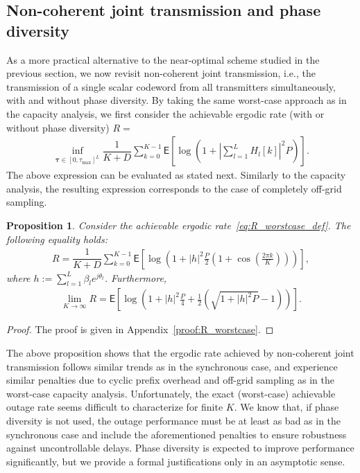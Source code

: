 \documentclass[10pt,journal,a4paper]{IEEEtran}
\newcommand{\eqdef}{:=}
\newcommand{\E}{\mathsf{E}}		%
\renewcommand{\vec}[1]{\bm{#1}}		%
\newtheorem{proposition}{Proposition}
\begin{document}
\subsection{Non-coherent joint transmission and phase diversity} 
As a more practical alternative to the near-optimal scheme studied in the previous section, we now revisit non-coherent joint transmission, i.e., the transmission of a single scalar codeword from all transmitters simultaneously, with and without phase diversity. By taking the same worst-case approach as in the capacity analysis, we first consider the achievable ergodic rate (with or without phase diversity) $R=$
\begin{align}\label{eq:R_worstcase_def}
\inf_{\vec{\tau}\in[0,\tau_{\max}]^L}\dfrac{1}{K+D}\sum_{k=0}^{K-1}\E\left[\log\left(1+\left|\sum_{l=1}^LH_l[k]\right|^2P\right)\right].
\end{align}
The above expression can be evaluated as stated next. Similarly to the capacity analysis, the resulting expression corresponds to the case of completely off-grid sampling.
\begin{proposition}\label{prop:R_worstcase}
Consider the achievable ergodic rate~\eqref{eq:R_worstcase_def}. The following equality holds: 
\begin{align*}
R = \dfrac{1}{K+D}\sum_{k=0}^{K-1}\E\left[\log\left(1+\left|h\right|^2 \frac{P}{2}\left(1+\cos\left(\frac{2\pi k}{K}\right)\right)\right)\right],
\end{align*}
where $h\eqdef \sum_{l=1}^ L\beta_le^{j\theta_l}$.
Furthermore, 
\begin{align*}
\lim_{K\to \infty} R = \E\left[\log\left(1+|h|^2 \frac{P}{4}+\frac{1}{2}(\sqrt{1+|h|^2 P}-1)\right)\right].
\end{align*}
\end{proposition}
\begin{proof}
The proof is given in Appendix~\ref{proof:R_worstcase}. 
\end{proof}
The above proposition shows that the ergodic rate achieved by non-coherent joint transmission follows similar trends as in the synchronous case, and experience similar penalties due to cyclic prefix overhead and off-grid sampling as in the worst-case capacity analysis. Unfortunately, the exact (worst-case) achievable outage rate seems difficult to characterize for finite $K$. We know that, if phase diversity is not used, the outage performance must be at least as bad as in the synchronous case and include the aforementioned penalties to ensure robustness against uncontrollable delays. Phase diversity is expected to improve performance significantly, but we provide a formal justifications only in an asymptotic sense. 
\end{document}
